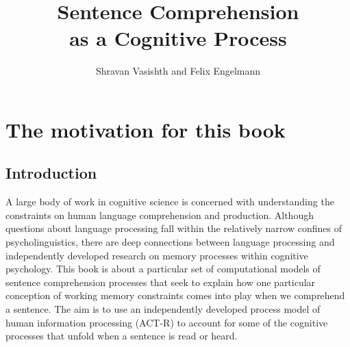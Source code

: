 \documentclass{cambridge7A}\usepackage[]{graphicx}\usepackage[]{color}
\begin{document}
  \title[A Computational Approach]
    {Sentence Comprehension \\ as a Cognitive Process}
  \author{Shravan Vasishth and Felix Engelmann}
 

\frontmatter
\maketitle
\tableofcontents
 

\listoffigures
\listoftables




\mainmatter


\chapter{The motivation for this book} \label{c00}

\section{Introduction}

A large body of work in cognitive science is concerned with
understanding the constraints on human language comprehension and
production. Although questions about language processing fall within the relatively narrow confines of psycholinguistics, there are deep connections between language processing and independently developed research on memory processes within cognitive psychology. This book is about a particular set of computational models of sentence
comprehension processes \citep{LewisVasishth2005,EngelmannJaegerVasishth2019} that seek to explain how one particular conception of working memory constraints
comes into play when we comprehend a sentence. The aim is to use an
independently developed process model of human information processing  
(ACT-R) to account for some of the cognitive processes that unfold
when a sentence is read or heard.
\end{document}
